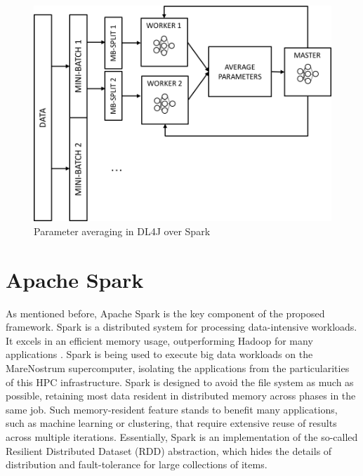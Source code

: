 \documentclass[journal]{IEEEtran}
\begin{document}
\begin{figure}
\begin{center}
\centerline{\includegraphics[width=1.0\linewidth]{img/distributed.png}}
\caption{Parameter averaging in DL4J over Spark}
\label{fig:dl4j}
\end{center}
\vspace{-0.5cm}
\end{figure}


\section{Apache Spark}
\label{sec:spark}

As mentioned before, Apache Spark is the key component of the proposed framework. Spark is a distributed system for processing data-intensive workloads. It excels in an efficient memory usage, outperforming Hadoop for many applications \cite{zaharia2012}. Spark is being used to execute big data workloads on the MareNostrum supercomputer, isolating the applications from the particularities of this HPC infrastructure. Spark is designed to avoid the file system as much as possible, retaining most data resident in distributed memory across phases in the same job. Such memory-resident feature stands to benefit many applications, such as machine learning or clustering, that require extensive reuse of results across multiple iterations.
Essentially, Spark is an implementation of the so-called Resilient Distributed Dataset (RDD) abstraction, which hides the details of distribution and fault-tolerance for large collections of items.
\end{document}

